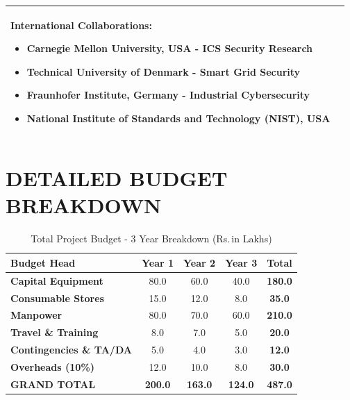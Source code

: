 \documentclass[12pt,a4paper]{article}
\newcommand{\rupees}{Rs.\,}
\renewcommand{\arraystretch}{1.3}
\begin{document}
\begin{longtable}{|p{3cm}|p{12cm}|}
\textbf{International Collaborations:}
\begin{itemize}[leftmargin=1em]
    \item Carnegie Mellon University, USA - ICS Security Research
    \item Technical University of Denmark - Smart Grid Security
    \item Fraunhofer Institute, Germany - Industrial Cybersecurity
    \item National Institute of Standards and Technology (NIST), USA
\end{itemize} \\
\hline

\end{longtable}

\newpage

\section{DETAILED BUDGET BREAKDOWN}

\begin{table}[H]
\centering
\caption{Total Project Budget - 3 Year Breakdown (\rupees in Lakhs)}
\renewcommand{\arraystretch}{1.5}
\begin{tabular}{|p{3.5cm}|c|c|c|c|}
\hline
\rowcolor{lightblue}
\textbf{Budget Head} & \textbf{Year 1} & \textbf{Year 2} & \textbf{Year 3} & \textbf{Total} \\
\hline

\textbf{Capital Equipment} & 80.0 & 60.0 & 40.0 & \textbf{180.0} \\
\hline

\textbf{Consumable Stores} & 15.0 & 12.0 & 8.0 & \textbf{35.0} \\
\hline

\textbf{Manpower} & 80.0 & 70.0 & 60.0 & \textbf{210.0} \\
\hline

\textbf{Travel \& Training} & 8.0 & 7.0 & 5.0 & \textbf{20.0} \\
\hline

\textbf{Contingencies \& TA/DA} & 5.0 & 4.0 & 3.0 & \textbf{12.0} \\
\hline

\textbf{Overheads (10\%)} & 12.0 & 10.0 & 8.0 & \textbf{30.0} \\
\hline

\rowcolor{yellow}
\textbf{GRAND TOTAL} & \textbf{200.0} & \textbf{163.0} & \textbf{124.0} & \textbf{487.0} \\
\hline

\end{tabular}
\end{table}
\end{document}
